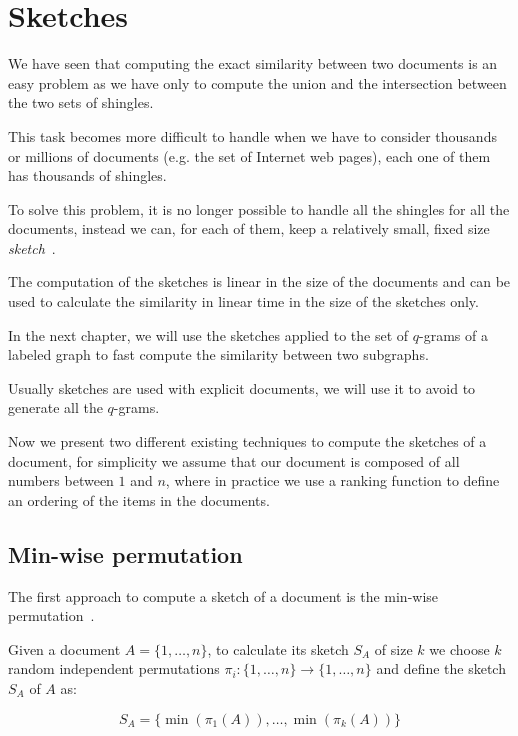 \section{Sketches}

We have seen that computing the exact similarity between two documents is an easy problem
as we have only to compute the union and the intersection between the two sets of shingles.\medskip

This task becomes more difficult to handle when we have to consider thousands or millions of documents
(e.g. the set of Internet web pages), each one of them has thousands of shingles.\medskip

To solve this problem, it is no longer possible to handle all the shingles for all the documents,  
instead we can, for each of them, keep a relatively small, fixed size \textit{sketch}~\cite{Broder2000}.

The computation of the sketches is linear in the size of the documents and can be used to calculate the similarity in linear time in the size of the sketches only.\medskip

In the next chapter, we will use the sketches applied to the set of $q$-grams of a labeled graph to fast compute the similarity between two subgraphs.\medskip

Usually sketches are used with explicit documents, we will use it to avoid to generate all the $q$-grams.\bigskip

Now we present two different existing techniques to compute the sketches of a document, 
for simplicity we assume that our document is composed of all numbers between $1$ and $n$, where in practice we use a ranking function to define an ordering of the items in the documents.

\subsection*{Min-wise permutation}

The first approach to compute a sketch of a document is the min-wise permutation~\cite{Broder:1998:MIP:276698.276781}.\bigskip

Given a document $A = \{1, \ldots, n\}$, to calculate its sketch $S_{A}$ of size $k$ 
we choose $k$ random independent permutations $\pi_{i} : \{1, \ldots, n\} \rightarrow \{1, \ldots, n\}$ and define the sketch $S_A$ of $A$ as:

\begin{equation}
S_{A} = \{ \min(\pi_{1}(A)), \ldots, \min(\pi_{k}(A)) \}
\end{equation}

